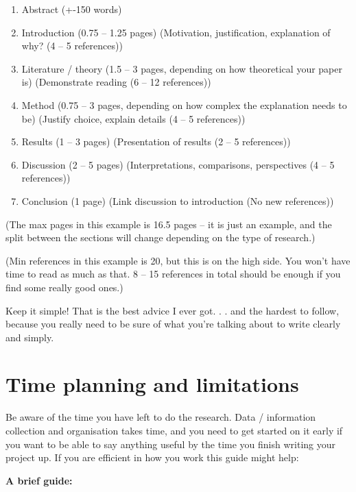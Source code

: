 \documentclass[
]{book}
\begin{document}
\begin{enumerate}
\def\labelenumi{\arabic{enumi}.}
\item
  Abstract (+-150 words)
\item
  Introduction (0.75 -- 1.25 pages) (Motivation, justification,
  explanation of why? (4 -- 5 references))
\item
  Literature / theory (1.5 -- 3 pages, depending on how theoretical
  your paper is) (Demonstrate reading (6 -- 12 references))
\item
  Method (0.75 -- 3 pages, depending on how complex the explanation
  needs to be) (Justify choice, explain details (4 -- 5 references))
\item
  Results (1 -- 3 pages) (Presentation of results (2 -- 5 references))
\item
  Discussion (2 -- 5 pages) (Interpretations, comparisons,
  perspectives (4 -- 5 references))
\item
  Conclusion (1 page) (Link discussion to introduction (No new
  references))
\end{enumerate}

(The max pages in this example is 16.5 pages -- it is just an example,
and the split between the sections will change depending on the type of
research.)

(Min references in this example is 20, but this is on the high side. You
won't have time to read as much as that. 8 -- 15 references in total
should be enough if you find some really good ones.)

Keep it simple! That is the best advice I ever got. . . and the hardest
to follow, because you really need to be sure of what you're talking
about to write clearly and simply.

\hypertarget{time-planning-and-limitations}{%
\chapter{Time planning and limitations}\label{time-planning-and-limitations}}

Be aware of the time you have left to do the research. Data /
information collection and organisation takes time, and you need to get
started on it early if you want to be able to say anything useful by the
time you finish writing your project up. If you are efficient in how you
work this guide might help:

\textbf{A brief guide:}
\end{document}
